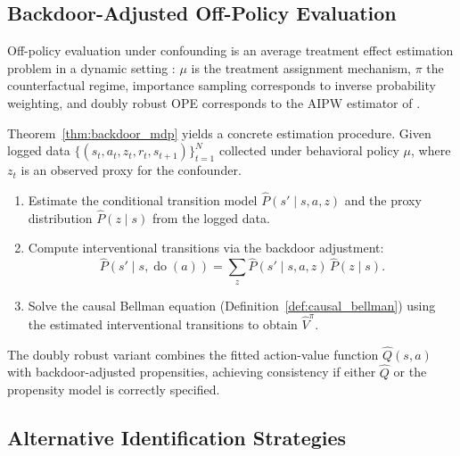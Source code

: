 \subsection{Backdoor-Adjusted Off-Policy Evaluation}
\label{subsec:backdoor_ope}

Off-policy evaluation under confounding is an average treatment effect estimation problem in a dynamic setting \citep{bannon2020causality}: $\mu$ is the treatment assignment mechanism, $\pi$ the counterfactual regime, importance sampling corresponds to inverse probability weighting, and doubly robust OPE corresponds to the AIPW estimator of \citet{robins1994estimation}.

Theorem~\ref{thm:backdoor_mdp} yields a concrete estimation procedure. Given logged data $\{(s_t, a_t, z_t, r_t, s_{t+1})\}_{t=1}^N$ collected under behavioral policy $\mu$, where $z_t$ is an observed proxy for the confounder.
\begin{enumerate}
\item Estimate the conditional transition model $\hat{P}(s' \mid s, a, z)$ and the proxy distribution $\hat{P}(z \mid s)$ from the logged data.
\item Compute interventional transitions via the backdoor adjustment:
\begin{equation}
\hat{P}(s' \mid s, \operatorname{do}(a)) = \sum_{z} \hat{P}(s' \mid s, a, z) \, \hat{P}(z \mid s).
\label{eq:backdoor_estimator}
\end{equation}
\item Solve the causal Bellman equation (Definition~\ref{def:causal_bellman}) using the estimated interventional transitions to obtain $\hat{V}^\pi$.
\end{enumerate}
The doubly robust variant combines the fitted action-value function $\hat{Q}(s,a)$ with backdoor-adjusted propensities, achieving consistency if either $\hat{Q}$ or the propensity model is correctly specified.

\subsection{Alternative Identification Strategies}
\label{subsec:alternative_identification}

